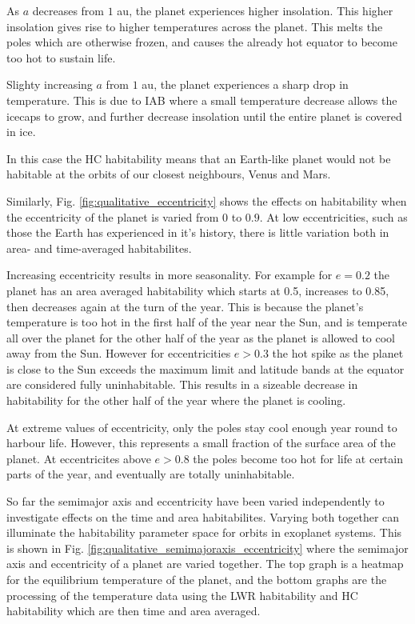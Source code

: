 \documentclass[12pt, onecolumn]{revtex4-2}    %
\begin{document}
As $a$ decreases from $1$ au, the planet experiences higher insolation.
This higher insolation gives rise to higher temperatures across the planet.
This melts the poles which are otherwise frozen, and causes the already hot equator to become too hot to sustain life.

Slighty increasing $a$ from $1$ au, the planet experiences a sharp drop in temperature.
This is due to IAB where a small temperature decrease allows the icecaps to grow, and further decrease insolation until the entire planet is covered in ice.

In this case the HC habitability means that an Earth-like planet would not be habitable at the orbits of our closest neighbours, Venus and Mars.


Similarly, Fig. \ref{fig:qualitative_eccentricity} shows the effects on habitability when the eccentricity of the planet is varied from $0$ to $0.9$.
At low eccentricities, such as those the Earth has experienced in it's history, there is little variation both in area- and time-averaged habitabilites.

Increasing eccentricity results in more seasonality.
For example for $e=0.2$ the planet has an area averaged habitability which starts at 0.5, increases to 0.85, then decreases again at the turn of the year.
This is because the planet's temperature is too hot in the first half of the year near the Sun, and is temperate all over the planet for the other half of the year as the planet is allowed to cool away from the Sun.
However for eccentricities $e>0.3$ the hot spike as the planet is close to the Sun exceeds the maximum limit and latitude bands at the equator are considered fully uninhabitable.
This results in a sizeable decrease in habitability for the other half of the year where the planet is cooling.

At extreme values of eccentricity, only the poles stay cool enough year round to harbour life.
However, this represents a small fraction of the surface area of the planet.
At eccentricites above $e > 0.8$ the poles become too hot for life at certain parts of the year, and eventually are totally uninhabitable.


So far the semimajor axis and eccentricity have been varied independently to investigate effects on the time and area habitabilites.
Varying both together can illuminate the habitability parameter space for orbits in exoplanet systems.
This is shown in Fig. \ref{fig:qualitative_semimajoraxis_eccentricity} where the semimajor axis and eccentricity of a planet are varied together.
The top graph is a heatmap for the equilibrium temperature of the planet, and the bottom graphs are the processing of the temperature data using the LWR habitability and HC habitability which are then time and area averaged.
\end{document}
